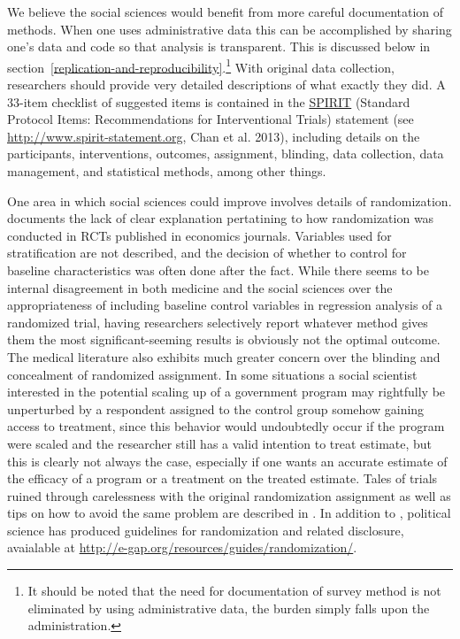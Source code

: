\documentclass[12pt] {article}
\begin{document}
We believe the social sciences would benefit from more careful documentation of methods. When one uses administrative data this can be accomplished by sharing one's data and code so that analysis is transparent. This is discussed below in section~\ref{replication-and-reproducibility}.\footnote{It should be noted that the need for documentation of survey method is not eliminated by using administrative data, the burden simply falls upon the administration.} With original data collection, researchers should provide very detailed descriptions of what exactly they did. A 33-item checklist of suggested items is contained in the \href{http://www.spirit-statement.org/}{SPIRIT} (Standard Protocol Items: Recommendations for Interventional
Trials) statement (see \url{http://www.spirit-statement.org}, Chan et al. 2013), including details on the participants, interventions, outcomes, assignment, blinding, data collection, data management, and statistical methods, among other things. 

One area in which social sciences could improve involves details of randomization. \cite{bruhn_pursuit_2009} documents the lack of clear explanation pertatining to how randomization was conducted in RCTs published in economics journals. Variables used for stratification are not described, and the decision of whether to control for baseline characteristics was often done after the fact. While there seems to be internal disagreement in both
medicine and the social sciences over the appropriateness of including baseline
control variables in regression analysis of a randomized trial, having
researchers selectively report whatever method gives them the most
significant-seeming results is obviously not the optimal outcome. The medical literature also exhibits much greater concern over the blinding and concealment of randomized assignment. In some situations a social scientist interested in the potential scaling up of a government program may rightfully be unperturbed by a respondent assigned to the control group somehow gaining access to treatment, since this behavior would undoubtedly occur if the program were scaled and the researcher still has a valid intention to treat estimate, but this is clearly not always the case, especially if one wants an accurate estimate of the efficacy of a program or a treatment on the treated estimate. Tales of trials ruined through carelessness with the original randomization assignment as well as tips on how to avoid the same problem are described in \cite{schulz_allocation_2002}. In addition to \cite{bruhn_pursuit_2009}, political science has produced guidelines for randomization and related disclosure, avaialable at \url{http://e-gap.org/resources/guides/randomization/}.
\end{document}
